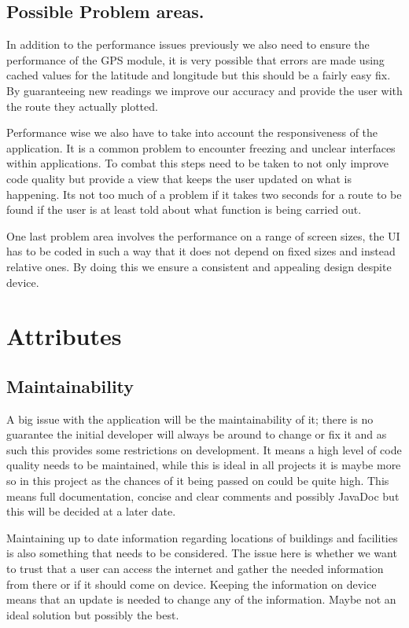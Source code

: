 \documentclass[10pt,a4paper]{article}
\begin{document}
\subsection{Possible Problem areas.}
In addition to the performance issues previously we also need to ensure the performance of the GPS module, it is very possible that errors are made using cached values for the latitude and longitude but this should be a fairly easy fix. By guaranteeing new readings we improve our accuracy and provide the user with the route they actually plotted. 

Performance wise we also have to take into account the responsiveness of the application. It is a common problem to encounter freezing and unclear interfaces within applications. To combat this steps need to be taken to not only improve code quality but provide a view that keeps the user updated on what is happening. Its not too much of a problem if it takes two seconds for a route to be found if the user is at least told about what function is being carried out. 

One last problem area involves the performance on a range of screen sizes, the UI has to be coded in such a way that it does not depend on fixed sizes and instead relative ones. By doing this we ensure a consistent and appealing design despite device. 

\section{Attributes}
\subsection{Maintainability}
A big issue with the application will be the maintainability of it; there is no guarantee the initial developer will always be around to change or fix it and as such this provides some restrictions on development. It means a high level of code quality needs to be maintained, while this is ideal in all projects it is maybe more so in this project as the chances of it being passed on could be quite high. This means full documentation, concise and clear comments and possibly JavaDoc but this will be decided at a later date. 

Maintaining up to date information regarding locations of buildings and facilities is also something that needs to be considered. The issue here is whether we want to trust that a user can access the internet and gather the needed information from there or if it should come on device. Keeping the information on device means that an update is needed to change any of the information. Maybe not an ideal solution but possibly the best. 
\end{document}
